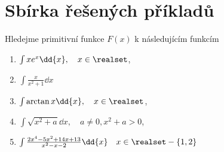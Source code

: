       

  \section{Sbírka řešených příkladů}
    Hledejme primitivní funkce \(F(x)\) k následujícím funkcím
    \begin{enumerate}
      \item \(\int{xe^x\dd{x}}, \quad x\in\realset\),
      \item \(\int\frac{x}{x^2+1}\dd{x}\)
      \item \(\int{\arctan x\dd{x}}, \quad x\in\realset\),
      \item \(\int{\sqrt{x^2+a}\dd{x}}, \quad a\neq0, x^2+a>0\),
      \item \(\int{\frac{2x^4-5x^2+14x+13}{x^2-x-2}\dd{x}} \quad x\in\realset - \{1,2\}\)
    \end{enumerate}

    
    
    
    
    
